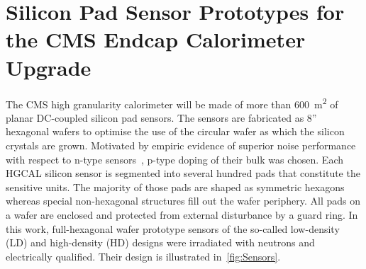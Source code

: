 \section{Silicon Pad Sensor Prototypes for the CMS Endcap Calorimeter Upgrade}
\label{sec:sensors}

The CMS high granularity calorimeter will be made of more than \SI{600}{\metre\squared} of planar DC-coupled silicon pad sensors.
The sensors are fabricated as 8'' hexagonal wafers to optimise the use of the circular wafer as which the silicon crystals are grown.
Motivated by empiric evidence of superior noise performance with respect to n-type sensors~\cite{Adam_2017}, p-type doping of their bulk was chosen.
Each HGCAL silicon sensor is segmented into several hundred pads that constitute the sensitive units. 
The majority of those pads are shaped as symmetric hexagons whereas special non-hexagonal structures fill out the wafer periphery.
All pads on a wafer are enclosed and protected from external disturbance by a guard ring.\newline
In this work, full-hexagonal wafer prototype sensors of the so-called low-density (LD) and high-density (HD) designs were irradiated with neutrons and electrically qualified.
Their design is illustrated in~\ref{fig:Sensors}.

